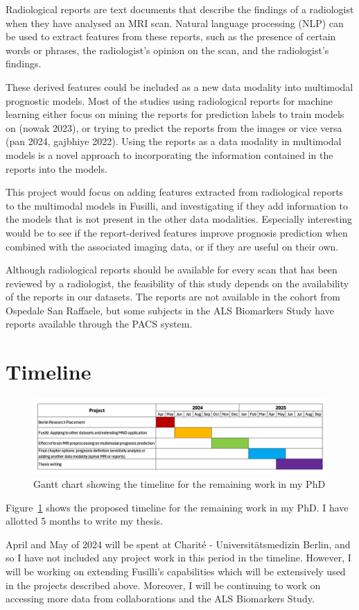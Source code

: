 Radiological reports are text documents that describe the findings of a radiologist when they have analysed an MRI scan.
Natural language processing (NLP) can be used to extract features from these reports, such as the presence of certain words or phrases, the radiologist's opinion on the scan, and the radiologist's findings.

These derived features could be included as a new data modality into multimodal prognostic models.
Most of the studies using radiological reports for machine learning either focus on mining the reports for prediction labels to train models on (nowak 2023), or trying to predict the reports from the images or vice versa (pan 2024, gajbhiye 2022).
Using the reports as a data modality in multimodal models is a novel approach to incorporating the information contained in the reports into the models.

This project would focus on adding features extracted from radiological reports to the multimodal models in Fusilli, and investigating if they add information to the models that is not present in the other data modalities.
Especially interesting would be to see if the report-derived features improve prognosis prediction when combined with the associated imaging data, or if they are useful on their own.

Although radiological reports should be available for every scan that has been reviewed by a radiologist, the feasibility of this study depends on the availability of the reports in our datasets.
The reports are not available in the cohort from Ospedale San Raffaele, but some subjects in the ALS Biomarkers Study have reports available through the PACS system.

\section{Timeline}

\begin{figure}
    \centering
    \hspace*{-0.1\textwidth}
    \includegraphics[width=1.2\textwidth]{figures/gantt_chart}
    \caption{Gantt chart showing the timeline for the remaining work in my PhD}
    \label{fig:gantt_chart}
\end{figure}

Figure~\ref{fig:gantt_chart} shows the proposed timeline for the remaining work in my PhD.
I have allotted 5 months to write my thesis.

April and May of 2024 will be spent at Charité - Universitätsmedizin Berlin, and so I have not included any project work in this period in the timeline.
However, I will be working on extending Fusilli's capabilities which will be extensively used in the projects described above.
Moreover, I will be continuing to work on accessing more data from collaborations and the ALS Biomarkers Study.
